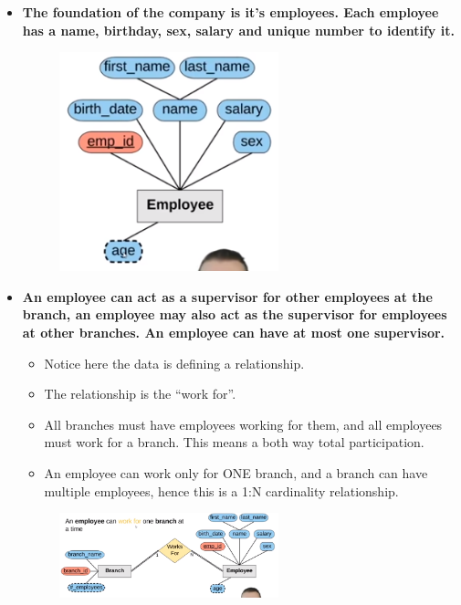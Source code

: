 \begin{itemize}
    \item \textbf{The foundation of the company is it's employees. Each employee has a name, birthday, sex, salary and unique number to identify it.}
        \begin{figure}[H]
            \centering
            \includegraphics[width=0.6\textwidth]{./Figs/2020-12-24-00-14-53.png}
        \end{figure}
    
    \item \textbf{An employee can act as a supervisor for other employees at the branch, an employee may also act as the supervisor for employees at other branches. An employee can have at most one supervisor.}
        \begin{itemize}
            \item Notice here the data is defining a relationship.
            \item The relationship is the ``work for''.
            \item All branches must have employees working for them, and all employees must work for a branch. This means a both way total participation.
            \item An employee can work only for ONE branch, and a branch can have multiple employees, hence this is a 1:N cardinality relationship.
        \end{itemize}
        \begin{figure}[H]
            \centering
            \includegraphics[width=0.6\textwidth]{./Figs/2020-12-24-00-16-07.png}
        \end{figure}
    

\end{itemize}
